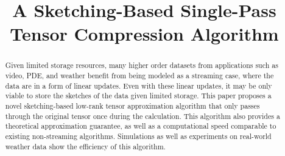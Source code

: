 \documentclass{article}
\title{A Sketching-Based Single-Pass Tensor Compression Algorithm}
\author{
}
\numberwithin{equation}{section}
\theoremstyle{plain}
\begin{document}

\maketitle


\begin{abstract}
    Given limited storage resources, many higher order datasets from applications such as video, PDE, and weather benefit from being modeled as a streaming case, where the data are in a form of linear updates. Even with these linear updates, it may be only viable to store the sketches of the data  given limited storage. This paper proposes a novel sketching-based low-rank tensor approximation algorithm that only passes through the original tensor once during the calculation. This algorithm also provides a theoretical approximation guarantee, as well as a computational speed comparable to existing non-streaming algorithms. Simulations as well as experiments on real-world weather data show the efficiency of this algorithm. 
    
\end{abstract}


\renewcommand{\algorithmicrequire}{\textbf{Input:}}
\renewcommand{\algorithmicensure}{\textbf{Output:}}






\newpage


\newpage 
 
\end{document}
